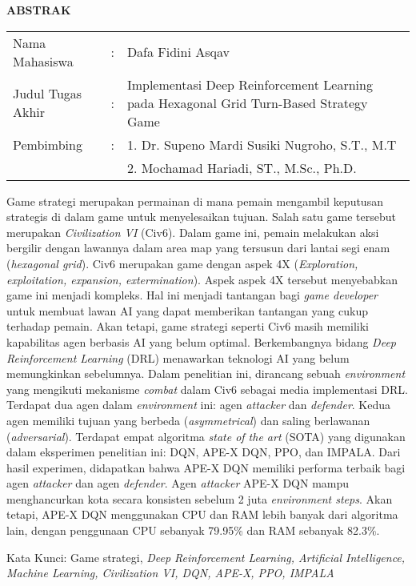 \begin{center}
  \large\textbf{ABSTRAK}
\end{center}


\vspace{2ex}

\begingroup
  \setlength{\tabcolsep}{0pt}

  \noindent
  \begin{tabularx}{\textwidth}{l >{\centering}m{2em} X}
    Nama Mahasiswa    &:& Dafa Fidini Asqav \\

    Judul Tugas Akhir &:&	Implementasi Deep Reinforcement Learning pada Hexagonal Grid Turn-Based Strategy Game \\

    Pembimbing        &:& 1. Dr. Supeno Mardi Susiki Nugroho, S.T., M.T \\
                      & & 2. Mochamad Hariadi, ST., M.Sc., Ph.D. \\
  \end{tabularx}
\endgroup

Game strategi merupakan permainan di mana pemain mengambil keputusan strategis di dalam game untuk menyelesaikan tujuan. 
Salah satu game tersebut merupakan \emph{Civilization VI} (Civ6).
Dalam game ini, pemain melakukan aksi bergilir dengan lawannya dalam area map yang tersusun dari lantai segi enam (\emph{hexagonal grid}).
Civ6 merupakan game dengan aspek 4X (\emph{Exploration, exploitation, expansion, extermination}). Aspek aspek 4X tersebut menyebabkan game ini menjadi kompleks.
Hal ini menjadi tantangan bagi \emph{game developer} untuk membuat lawan AI yang dapat memberikan tantangan yang cukup terhadap pemain. 
Akan tetapi, game strategi seperti Civ6 masih memiliki kapabilitas agen berbasis AI yang belum optimal.
Berkembangnya bidang \emph{Deep Reinforcement Learning} (DRL) menawarkan teknologi AI yang belum memungkinkan sebelumnya.
Dalam penelitian ini, dirancang sebuah \emph{environment} yang mengikuti mekanisme \emph{combat} dalam Civ6
sebagai media implementasi DRL. Terdapat dua agen dalam \emph{environment} ini: agen \emph{attacker} dan \emph{defender}.
Kedua agen memiliki tujuan yang berbeda (\emph{asymmetrical}) dan saling berlawanan (\emph{adversarial}).
Terdapat empat algoritma \emph{state of the art} (SOTA) yang digunakan dalam eksperimen penelitian ini:
DQN, APE-X DQN, PPO, dan IMPALA. Dari hasil experimen, didapatkan bahwa APE-X DQN memiliki performa terbaik bagi agen \emph{attacker}
dan agen \emph{defender}. Agen \emph{attacker} APE-X DQN mampu menghancurkan kota secara konsisten sebelum 2 juta \emph{environment steps}.
Akan tetapi, APE-X DQN menggunakan CPU dan RAM lebih banyak dari algoritma lain, dengan penggunaan CPU sebanyak 79.95\% dan RAM sebanyak 82.3\%.

Kata Kunci: Game strategi, \emph{Deep Reinforcement Learning, Artificial Intelligence, Machine Learning, Civilization VI, DQN, APE-X, PPO, IMPALA}
